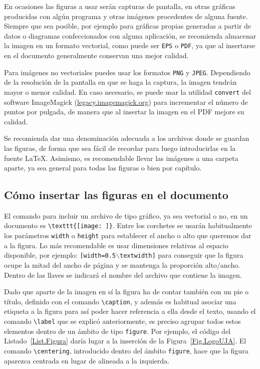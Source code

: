 En ocasiones las figuras a usar serán capturas de pantalla, en otras gráficas producidas con algún programa y otras imágenes procedentes de alguna fuente. Siempre que sea posible, por ejemplo para gráficas propias generadas a partir de datos o diagramas confeccionados con alguna aplicación, se recomienda almacenar la imagen en un formato vectorial, como puede ser \texttt{EPS} o \texttt{PDF}, ya que al insertarse en el documento generalmente conservan una mejor calidad.

Para imágenes no vectoriales puedes usar los formatos \texttt{PNG} y \texttt{JPEG}. Dependiendo de la resolución de la pantalla en que se haga la captura, la imagen tendrán mayor o menor calidad. En caso necesario, se puede usar la utilidad \texttt{convert} del software ImageMagick (\url{legacy.imagemagick.org}) para incrementar el número de puntos por pulgada, de manera que al insertar la imagen en el PDF mejore su calidad.

Se recomienda dar una denominación adecuada a los archivos donde se guardan las figuras, de forma que sea fácil de recordar para luego introducirlas en la fuente \LaTeX. Asimismo, es recomendable llevar las imágenes a una carpeta aparte, ya sea general para todas las figuras o bien por capítulo.

\subsection{Cómo insertar las figuras en el documento}

El comando para incluir un archivo de tipo gráfico, ya sea vectorial o no, en un documento es \verb|\texttt{[image: ]}|. Entre los corchetes se usarán habitualmente los parámetros \texttt{width} o \texttt{height} para establecer el ancho o alto que queremos dar a la figura. Lo más recomendable es usar dimensiones relativas al espacio disponible, por ejemplo: \texttt{[width=0.5$\backslash$textwidth]} para conseguir que la figura ocupe la mitad del ancho de página y se mantenga la proporción alto/ancho. Dentro de las llaves se indicará el nombre del archivo que contiene la imagen.

Dado que aparte de la imagen en sí la figura ha de contar también con un pie o título, definido con el comando \verb|\caption|, y además es habitual asociar una etiqueta a la figura para así poder hacer referencia a ella desde el texto, usando el comando \verb|\label| que se explicó anteriormente, es preciso agrupar todos estos elementos dentro de un ámbito de tipo \texttt{figure}. Por ejemplo, el código del Listado~\ref{List.Figura} daría lugar a la inserción de la Figura~\ref{Fig.LogoUJA}. El comando \verb|\centering|, introducido dentro del ámbito \texttt{figure}, hace que la figura aparezca centrada en lugar de alineada a la izquierda.


